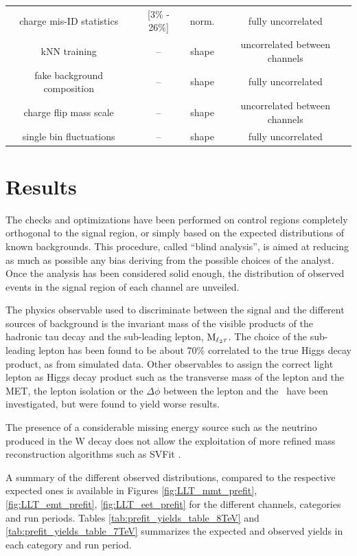 \begin{table}
\begin{center}
\begin{tabular}{c c c c}
      charge mis-ID statistics & [3\% - 26\%] & norm. & fully uncorrelated \\
      kNN training & -- & shape & uncorrelated between channels \\
      fake background composition & -- & shape & fully uncorrelated \\
      charge flip mass scale & -- & shape & uncorrelated between channels \\
      single bin fluctuations & -- & shape & fully uncorrelated \\
      \hline
    \end{tabular}
  \end{center}
\end{table}

\section{Results}

The checks and optimizations have been performed on control regions completely orthogonal to the signal region, or simply based on the expected distributions of known backgrounds. This procedure, called ``blind analysis'', is aimed at reducing as much as possible any bias deriving from the possible choices of the analyst. 
Once the analysis has been considered solid enough, the distribution of observed events in the signal region of each channel are unveiled. 

The physics observable used to discriminate between the signal and the different sources of background is the invariant mass of the visible products of the hadronic tau decay and the sub-leading lepton, $\rm{M}_{\ell_2 \tau}$. The choice of the sub-leading lepton has been found to be about 70\% correlated to the true Higgs decay product, as from simulated data. Other observables to assign the correct light lepton as Higgs decay product such as the transverse mass of the lepton and the MET, the lepton isolation or the $\Delta\phi$ between the lepton and the \MET\ have been investigated, but were found to yield worse results.

The presence of a considerable missing energy source such as the neutrino produced in the W decay does not allow the exploitation of more refined mass reconstruction algorithms such as SVFit \cite{H_tautau}.

A summary of the different observed distributions, compared to the respective expected ones is available in Figures \ref{fig:LLT_mmt_prefit}, \ref{fig:LLT_emt_prefit}, \ref{fig:LLT_eet_prefit} for the different channels, categories and run periods. Tables \ref{tab:prefit_yields_table_8TeV} and \ref{tab:prefit_yields_table_7TeV} summarizes the expected and observed yields in each category and run period.

